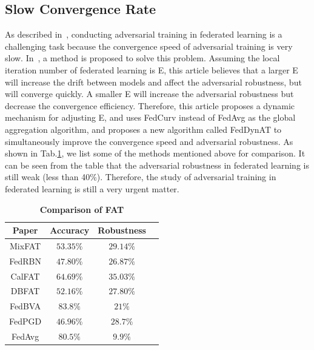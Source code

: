 \subsection{Slow Convergence Rate}

As described in~\cite{zhang2023delving}, conducting adversarial training
in federated learning is a challenging task because the
convergence speed of adversarial training is very slow.
In~\cite{shah2021adversarial}, a method is proposed to solve this problem.
Assuming the local iteration number of federated learning
is E, this article believes that a larger E will increase the
drift between models and affect the adversarial robustness,
but will converge quickly. A smaller E will increase
the adversarial robustness but decrease the convergence
eﬀiciency. Therefore, this article proposes a dynamic
mechanism for adjusting E, and uses FedCurv instead of
FedAvg as the global aggregation algorithm, and proposes
a new algorithm called FedDynAT to simultaneously
improve the convergence speed and adversarial robustness.
As shown in Tab.\ref{Comparison of FAT}, we list some of the methods
mentioned above for comparison. It can be seen from the
table that the adversarial robustness in federated learning
is still weak (less than 40\%). Therefore, the study of
adversarial training in federated learning is still a very
urgent matter. 

\begin{table}[t]
    \caption{\textbf{Comparison of FAT}}
    \label{Comparison of FAT}
    \centering
    \begin{tabular}{|c|c|c|c|} %
    \toprule %
    \textbf{Paper}  & \textbf{Accuracy} & \textbf{Robustness}\\ 
    \midrule
     MixFAT& $53.35\%$ &   $29.14\%$ \\
     \midrule
     FedRBN& $47.80\%$ &  $26.87\%$ \\
     \midrule
     CalFAT& $64.69\%$ & $35.03\%$   \\
     \midrule
     DBFAT& $52.16\%$ &  $27.80\%$  \\
     \midrule
     FedBVA& $83.8\%$ &  $21\%$  \\
     \midrule
     FedPGD& $46.96\%$ &  $28.7\%$  \\
     \midrule
     FedAvg& $80.5\%$ &  $9.9\%$  \\
    \toprule
    \end{tabular}
    \end{table}  